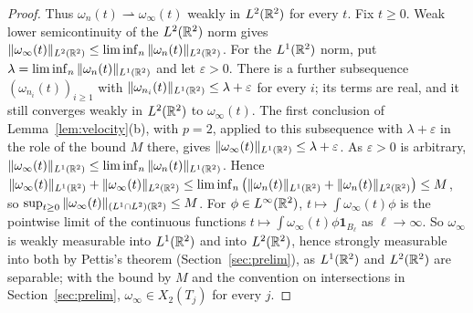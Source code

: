 \begin{proof}
Thus $\omega_n(t)\rightharpoonup\omega_\infty(t)$ weakly in $L^2(\mathbb{R}^2)$ for every $t$.
Fix $t\ge0$. Weak lower semicontinuity of the $L^2(\mathbb{R}^2)$ norm gives
$\|\omega_\infty(t)\|_{L^2(\mathbb{R}^2)}\le\liminf_n\|\omega_n(t)\|_{L^2(\mathbb{R}^2)}$. For the $L^1(\mathbb{R}^2)$
norm, put $\lambda=\liminf_n\|\omega_n(t)\|_{L^1(\mathbb{R}^2)}$ and let $\varepsilon>0$. There
is a further subsequence $(\omega_{n_i}(t))_{i\ge1}$ with
$\|\omega_{n_i}(t)\|_{L^1(\mathbb{R}^2)}\le\lambda+\varepsilon$ for every $i$; its terms are
real, and it still converges weakly in $L^2(\mathbb{R}^2)$ to $\omega_\infty(t)$. The first
conclusion of Lemma~\ref{lem:velocity}(b), with $p=2$, applied to this
subsequence with $\lambda+\varepsilon$ in the role of the bound $M$ there, gives
$\|\omega_\infty(t)\|_{L^1(\mathbb{R}^2)}\le\lambda+\varepsilon$. As $\varepsilon>0$ is
arbitrary, $\|\omega_\infty(t)\|_{L^1(\mathbb{R}^2)}\le\liminf_n\|\omega_n(t)\|_{L^1(\mathbb{R}^2)}$. Hence
$\|\omega_\infty(t)\|_{L^1(\mathbb{R}^2)}+\|\omega_\infty(t)\|_{L^2(\mathbb{R}^2)}\le\liminf_n\big(\|\omega_n(t)\|_{L^1(\mathbb{R}^2)}+\|\omega_n(t)\|_{L^2(\mathbb{R}^2)}\big)\le M$,
so $\sup_{t\ge0}\|\omega_\infty(t)\|_{(L^1\cap L^2)(\mathbb{R}^2)}\le M$.
For $\phi\in L^\infty(\mathbb{R}^2)$, $t\mapsto\int\omega_\infty(t)\phi$ is the pointwise
limit of the continuous functions $t\mapsto\int\omega_\infty(t)\phi\mathbf 1_{B_\ell}$
as $\ell\to\infty$. So $\omega_\infty$ is weakly measurable into $L^1(\mathbb{R}^2)$ and into
$L^2(\mathbb{R}^2)$, hence strongly measurable into both by Pettis's theorem
(Section~\ref{sec:prelim}), as $L^1(\mathbb{R}^2)$ and $L^2(\mathbb{R}^2)$ are separable; with the bound by
$M$ and the convention on intersections in Section~\ref{sec:prelim},
$\omega_\infty\in X_2(T_j)$ for every $j$.


\end{proof}
